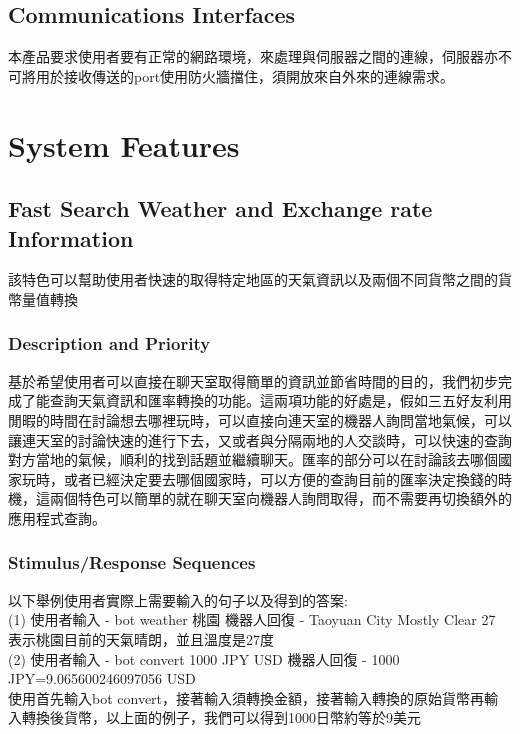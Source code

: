 \documentclass{scrreprt}
\begin{document}
\begin{CJK}{UTF8}{bkai}
\section{Communications Interfaces}
本產品要求使用者要有正常的網路環境，來處理與伺服器之間的連線，伺服器亦不可將用於接收傳送的port使用防火牆擋住，須開放來自外來的連線需求。


\chapter{System Features}


\section{Fast Search Weather and Exchange rate Information}
該特色可以幫助使用者快速的取得特定地區的天氣資訊以及兩個不同貨幣之間的貨幣量值轉換

\subsection{Description and Priority}
基於希望使用者可以直接在聊天室取得簡單的資訊並節省時間的目的，我們初步完成了能查詢天氣資訊和匯率轉換的功能。這兩項功能的好處是，假如三五好友利用閒暇的時間在討論想去哪裡玩時，可以直接向連天室的機器人詢問當地氣候，可以讓連天室的討論快速的進行下去，又或者與分隔兩地的人交談時，可以快速的查詢對方當地的氣候，順利的找到話題並繼續聊天。匯率的部分可以在討論該去哪個國家玩時，或者已經決定要去哪個國家時，可以方便的查詢目前的匯率決定換錢的時機，這兩個特色可以簡單的就在聊天室向機器人詢問取得，而不需要再切換額外的應用程式查詢。

\subsection{Stimulus/Response Sequences}
以下舉例使用者實際上需要輸入的句子以及得到的答案: \\
(1) 使用者輸入 - bot weather 桃園 	機器人回復 - Taoyuan City Mostly Clear 27\\
表示桃園目前的天氣晴朗，並且溫度是27度\\
(2) 使用者輸入 - bot convert 1000 JPY USD 		機器人回復 - 1000 JPY=9.065600246097056 USD\\
使用首先輸入bot convert，接著輸入須轉換金額，接著輸入轉換的原始貨幣再輸入轉換後貨幣，以上面的例子，我們可以得到1000日幣約等於9美元\\


\end{CJK}
\end{document}
